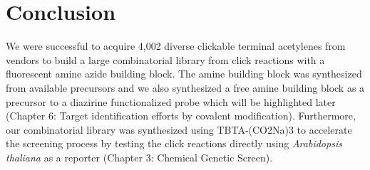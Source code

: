 \section{Conclusion}

We were successful to acquire 4,002 diverse clickable terminal acetylenes from vendors to build a large combinatorial library from click reactions with a fluorescent amine azide building block. The amine building block was synthesized from available precursors and we also synthesized a free amine building block as a precursor to a diazirine functionalized probe which will be highlighted later (Chapter 6: Target identification efforts by covalent modification). Furthermore, our combinatorial library was synthesized using TBTA-(CO2Na)3 to accelerate the screening process by testing the click reactions directly using {\it Arabidopsis thaliana} as a reporter (Chapter 3: Chemical Genetic Screen).


